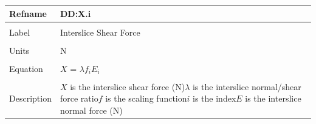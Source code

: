 \documentclass[12pt]{article}
\begin{document}
\noindent \begin{minipage}{\textwidth}
\begin{tabular}{p{} p{}}
\toprule \textbf{Refname} & \textbf{DD:X.i}
\label{DD:X.i}
\\ \midrule \\
Label & Interslice Shear Force
\\ \midrule \\
Units & N
\\ \midrule \\
Equation & $X$ = $\lambda{} f_{i} E_{i}$
\\ \midrule \\
Description & $X$ is the interslice shear force (N)\newline$\lambda{}$ is the interslice normal/shear force ratio\newline$f$ is the scaling function\newline$i$ is the index\newline$E$ is the interslice normal force (N)
\\ \bottomrule \end{tabular}
\end{minipage}\\
~\newline
\end{document}
